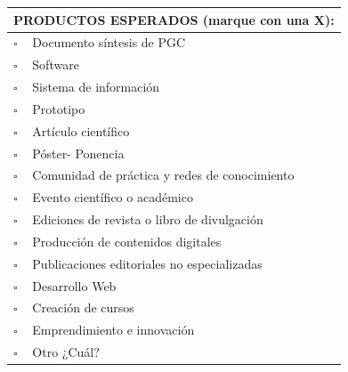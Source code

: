 \documentclass[11pt]{article}
\newcommand{\formlabel}[1]{\textbf{\small #1}}
\newcommand{\formcell}[1]{\small #1}
\begin{document}
\vspace{0.20cm}
\noindent
\begin{tabular}{|p{0.72cm}|p{14.50cm}|}
\hline
\multicolumn{2}{|p{15.38cm}|}{\formlabel{PRODUCTOS ESPERADOS (marque con una X):}} \\
\hline
$\square$ & \formcell{Documento síntesis de PGC} \\
\hline
$\square$ & \formcell{Software} \\
\hline
$\square$ & \formcell{Sistema de información} \\
\hline
$\square$ & \formcell{Prototipo} \\
\hline
$\square$ & \formcell{Artículo científico} \\
\hline
$\square$ & \formcell{Póster- Ponencia} \\
\hline
$\square$ & \formcell{Comunidad de práctica y redes de conocimiento} \\
\hline
$\square$ & \formcell{Evento científico o académico} \\
\hline
$\square$ & \formcell{Ediciones de revista o libro de divulgación} \\
\hline
$\square$ & \formcell{Producción de contenidos digitales} \\
\hline
$\square$ & \formcell{Publicaciones editoriales no especializadas} \\
\hline
$\square$ & \formcell{Desarrollo Web} \\
\hline
$\square$ & \formcell{Creación de cursos} \\
\hline
$\square$ & \formcell{Emprendimiento e innovación} \\
\hline
$\square$ & \formcell{Otro ¿Cuál?} \\
\hline
\end{tabular}
\end{document}
